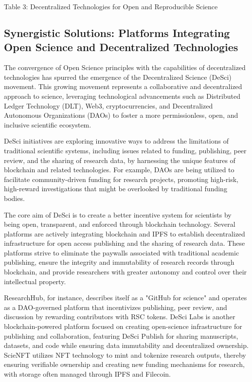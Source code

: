 \documentclass{article}
\begin{document}
Table 3: Decentralized Technologies for Open and Reproducible Science

\subsection{Synergistic Solutions: Platforms Integrating Open Science and Decentralized Technologies}

The convergence of Open Science principles with the capabilities of decentralized technologies has spurred the emergence of the Decentralized Science (DeSci) movement. This growing movement represents a collaborative and decentralized approach to science, leveraging technological advancements such as Distributed Ledger Technology (DLT), Web3, cryptocurrencies, and Decentralized Autonomous Organizations (DAOs) to foster a more permissionless, open, and inclusive scientific ecosystem.

DeSci initiatives are exploring innovative ways to address the limitations of traditional scientific systems, including issues related to funding, publishing, peer review, and the sharing of research data, by harnessing the unique features of blockchain and related technologies. For example, DAOs are being utilized to facilitate community-driven funding for research projects, promoting high-risk, high-reward investigations that might be overlooked by traditional funding bodies.

The core aim of DeSci is to create a better incentive system for scientists by being open, transparent, and enforced through blockchain technology. Several platforms are actively integrating blockchain and IPFS to establish decentralized infrastructure for open access publishing and the sharing of research data. These platforms strive to eliminate the paywalls associated with traditional academic publishing, ensure the integrity and immutability of research records through blockchain, and provide researchers with greater autonomy and control over their intellectual property.

ResearchHub, for instance, describes itself as a "GitHub for science" and operates as a DAO-governed platform that incentivizes publishing, peer review, and discussion by rewarding contributors with RSC tokens. DeSci Labs is another blockchain-powered platform focused on creating open-science infrastructure for publishing and collaboration, featuring DeSci Publish for sharing manuscripts, datasets, and code while ensuring data immutability and decentralized ownership. ScieNFT utilizes NFT technology to mint and tokenize research outputs, thereby ensuring verifiable ownership and creating new funding mechanisms for research, with storage often managed through IPFS and Filecoin.
\end{document}
